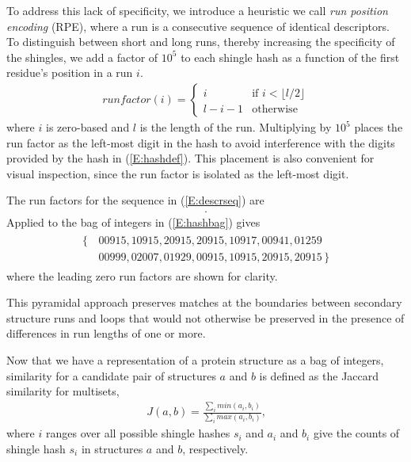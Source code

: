 \documentclass[10pt,letterpaper]{article}
\begin{document}
To address this lack of specificity, we introduce a heuristic we call \emph{run position encoding} (RPE), where a run is a consecutive sequence of identical descriptors. 
To distinguish between short and long runs, thereby increasing the specificity of the shingles, we add a factor of $10^5$ to each shingle hash as a function of the first residue's position in a run $i$. 
\begin{gather}
    runfactor(i) = 
    \begin{cases}
        i               &\text{if $i < \lfloor l/2 \rfloor$}\\
        l - i - 1       &\text{otherwise} 
    \end{cases}
\end{gather}
where $i$ is zero-based and $l$ is the length of the run.
Multiplying by $10^5$ places the run factor as the left-most digit in the hash to avoid interference with the digits provided by the hash in (\ref{E:hashdef}).
This placement is also convenient for visual inspection, since the run factor is isolated as the left-most digit. 

The run factors for the sequence in (\ref{E:descrseq}) are
\begin{align}
    [\, 0, 1, 2, 2, 1, 0, 0, 0, 0, 0, 0, 1, 2, 2, 1, 0 \,].
\end{align}
Applied to the bag of integers in (\ref{E:hashbag}) gives
\begin{align}\label{E:rpebag}
    \begin{split}
    \{\,&00915, 10915, 20915, 20915, 10917, 00941, 01259 \\
        &00999, 02007, 01929, 00915, 10915, 20915, 20915 \,\}
    \end{split}
\end{align}
where the leading zero run factors are shown for clarity. 

This pyramidal approach preserves matches at the boundaries between secondary structure runs and loops that would not otherwise be preserved in the presence of differences in run lengths of one or more. 

Now that we have a representation of a protein structure as a bag of integers, similarity for a candidate pair of structures $a$ and $b$ is defined as the Jaccard similarity \cite{Levan1971} for multisets,
\begin{align}
    J(a,b) = \frac{\sum_i min(a_i, b_i)}{\sum_i max(a_i,b_i)}\text{,}
\end{align}
where $i$ ranges over all possible shingle hashes $s_i$ and $a_i$ and $b_i$ give the counts of shingle hash $s_i$ in structures $a$ and $b$, respectively. 
\end{document}
